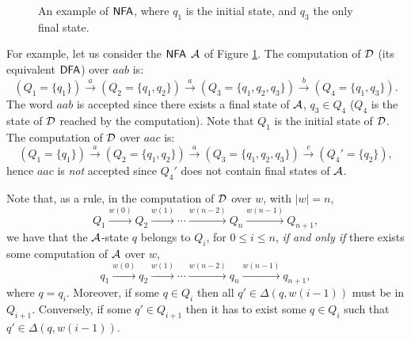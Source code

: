 \begin{figure}[t]
    \centering
    \caption{An example of $\text{\sffamily NFA}$, where $q_1$ is the initial state, and $q_3$ the only final state.}\label{fig:Nfa}
\end{figure}
For example, let us consider the $\text{\sffamily NFA}$ $\mathcal{A}$ of Figure \ref{fig:Nfa}.
The computation of $\mathcal{D}$ (its equivalent $\text{\sffamily DFA}$) over $aab$ is:
\begin{equation}
    (Q_1=\{q_1\}) \stackrel{a}{\to} 
    (Q_2=\{q_1,q_2\}) \stackrel{a}{\to} 
    (Q_3=\{q_1,q_2,q_3\}) \stackrel{b}{\to} (Q_4=\{q_1,q_3\}). 
\label{eq:1}\end{equation}
The word $aab$ is accepted since there exists a final state of $\mathcal{A}$, $q_3\in Q_4$ ($Q_4$ is the state of $\mathcal{D}$ reached by the computation). Note that $Q_1$ is the initial state of $\mathcal{D}$.
%
The computation of $\mathcal{D}$ over $aac$ is:
\begin{equation}
    (Q_1=\{q_1\}) \stackrel{a}{\to} 
    (Q_2=\{q_1,q_2\}) \stackrel{a}{\to} 
    (Q_3=\{q_1,q_2,q_3\}) \stackrel{c}{\to} (Q_4'=\{q_2\}), 
\end{equation}
hence $aac$ is \emph{not} accepted since $Q_4'$ does not contain final states of $\mathcal{A}$.

Note that, as a rule, in the computation of $\mathcal{D}$ over $w$, with $|w|=n$,
\[
    Q_1 \stackrel{w(0)}{\to}
    Q_2 \stackrel{w(1)}{\to}
    \cdots \stackrel{w(n-2)}{\to}
    Q_{n} \stackrel{w(n-1)}{\to} Q_{n+1},
\]
we have that the $\mathcal{A}$-state $q$ belongs to $Q_i$, for $0\leq i\leq n$, \emph{if and only if} there exists some computation of $\mathcal{A}$ over $w$, 
\[  q_1 \stackrel{w(0)}{\to}
    q_2 \stackrel{w(1)}{\to}
    \cdots \stackrel{w(n-2)}{\to}
    q_{n} \stackrel{w(n-1)}{\to} q_{n+1},
\]
where $q=q_i$.
Moreover, if some $q\in Q_{i}$ then all $q'\in\Delta(q,w(i-1))$ must be in $Q_{i+1}$. Conversely, if some $q'\in Q_{i+1}$ then it has to exist some $q\in Q_i$ such that $q'\in\Delta(q,w(i-1))$.

